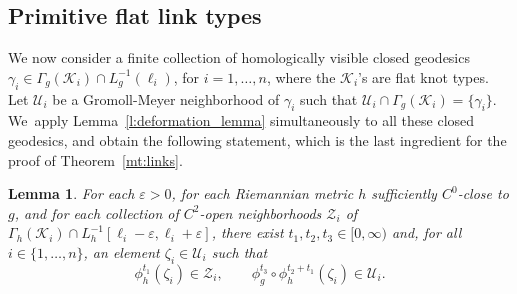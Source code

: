 \documentclass[JEP,XML,SOM,Unicode,NoFloatCountersInSection,published]{cedram}
\let\epsilon\varepsilon
\newcommand{\KK}{\mathcal{K}}
\newcommand{\UU}{\mathcal{U}}
\newcommand{\ZZ}{\mathcal{Z}}
\theoremstyle{plain}
\newtheorem{Lemma}[Thm]{Lemma}
\theoremstyle{definition}
\begin{document}
\subsection{Primitive flat link types}
We now consider a finite collection of homologically visible closed geodesics $\gamma_i\in\Gamma_g(\KK_i)\cap L_g^{-1}(\ell_i)$, for $i=1,\dots,n$, where the $\KK_i$'s are flat knot types. Let $\UU_i$ be a Gromoll-Meyer neighborhood of $\gamma_i$ such that $\UU_i\cap\Gamma_g(\KK_i)=\{\gamma_i\}$. We~apply Lemma~\ref{l:deformation_lemma} simultaneously to all these closed geodesics, and obtain the following statement, which is the last ingredient for the proof of Theorem~\ref{mt:links}.

\begin{Lemma}\label{l:intertwining}
For each $\epsilon>0$, for each Riemannian metric $h$ sufficiently $C^0$-close to $g$, and for each collection of $C^2$-open neighborhoods $\ZZ_i$ of $\Gamma_h(\KK_i)\cap L_h^{-1}[\ell_i-\epsilon,\ell_i+\epsilon]$, there exist $t_1,t_2,t_3\in[0,\infty)$ and, for all $i\in\{1,\dots,n\}$, an element $\zeta_i\in\UU_i$ such that
\[
\phi_h^{t_1}(\zeta_i)\in\ZZ_i,
\qquad
\phi_g^{t_3}\circ\phi_h^{t_2+t_1}(\zeta_i)\in\UU_i.
\]
\end{Lemma}
\end{document}

